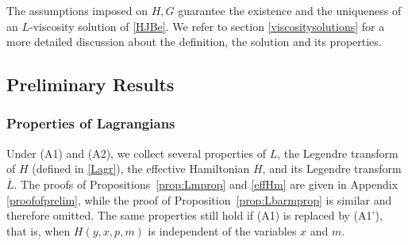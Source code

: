 \documentclass[reqno,11pt]{amsart}
\numberwithin{equation}{section}
\newcommand{\yh}[1]{{\color{orange}[YH: #1]}}
\renewcommand{\bar}{\overline}
\begin{document}
    The assumptions imposed on $H,G$ guarantee the existence and the uniqueness of an $L$-viscosity solution of \eqref{HJBe}. We refer to section \ref{viscositysolutions} for a more detailed discussion about the definition, the solution and its properties.





\subsection{Preliminary Results}
\subsubsection{Properties of Lagrangians }
Under (A1) and (A2), we collect several properties of $L$, the Legendre transform of $H$ (defined in \eqref{Lagr}), the effective Hamiltonian $\bar{H}$, and its Legendre transform $\bar{L}$. The proofs of Propositions~\ref{prop:Lmprop} and \ref{effHm} are given in Appendix \ref{proofofprelim}, while the proof of Proposition~\ref{prop:Lbarmprop} is similar and therefore omitted. The same properties still hold if (A1) is replaced by (A1'), that is, when $H(y,x,p,m)$ is independent of the variables $x$ and $m$.
\end{document}
